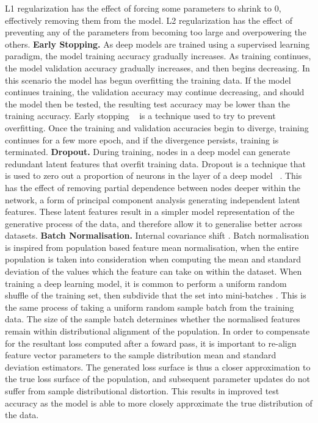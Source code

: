 L1 regularization has the effect of forcing some parameters to shrink to 0, effectively removing them from the model. L2 regularization has the effect of preventing any of the parameters from becoming too large and overpowering the others. \newline
\textbf{Early Stopping.} As deep models are trained using a supervised learning paradigm, the model training accuracy gradually increases. As training continues, the model validation accuracy gradually increases, and then begins decreasing. In this scenario the model has begun overfitting the training data. If the model continues training, the validation accuracy may continue decreasing, and should the model then be tested, the resulting test accuracy may be lower than the training accuracy. Early stopping ~\citep{prechelt1998early} is a technique used to try to prevent overfitting. Once the training and validation accuracies begin to diverge, training continues for a few more epoch, and if the divergence persists, training is terminated. \newline
\textbf{Dropout.} During training, nodes in a deep model can generate redundant latent features that overfit training data. Dropout is a technique that is used to zero out a proportion of neurons in the layer of a deep model ~\citep{srivastava2014dropout}. This has the effect of removing partial dependence between nodes deeper within the network, a form of principal component analysis generating independent latent features. These latent features result in a simpler model representation of the generative process of the data, and therefore allow it to generalise better across datasets. \newline
\textbf{Batch Normalisation.} Internal covariance shift \cite{reference}. Batch normalisation is inspired from population based feature mean normalisation, when the entire population is taken into consideration when computing the mean and standard deviation of the values which the feature can take on within the dataset. When training a deep learning model, it is common to perform a uniform random shuffle of the training set, then subdivide that the set into mini-batches \cite{reference}. This is the same process of taking a uniform random sample batch from the training data. The size of the sample batch determines whether the normalised features remain within distributional alignment of the population. In order to compensate for the resultant loss computed after a foward pass, it is important to re-align feature vector parameters to the sample distribution mean and standard deviation estimators. The generated loss surface is thus a closer approximation to the true loss surface of the population, and subsequent parameter updates do not suffer from sample distributional distortion. This results in improved test accuracy as the model is able to more closely approximate the true distribution of the data. \newline 
